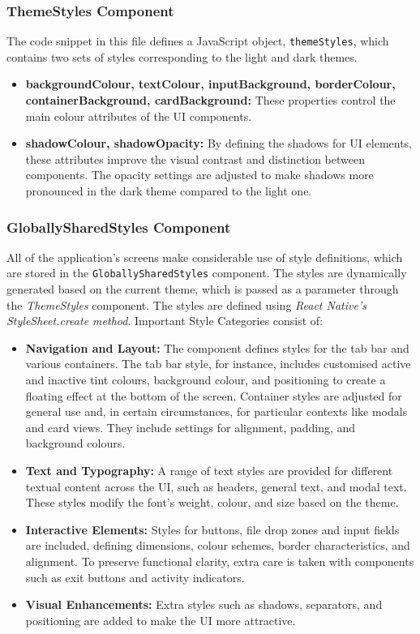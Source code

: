 \subsubsection{ThemeStyles Component}

The code snippet in this file defines a JavaScript object, \texttt{themeStyles}, which contains two sets of styles corresponding to the light and dark themes.

\begin{itemize}
    \item \textbf{backgroundColour, textColour, inputBackground, borderColour, containerBackground, cardBackground:} These properties control the main colour attributes of the UI components.
    \item \textbf{shadowColour, shadowOpacity:} By defining the shadows for UI elements, these attributes improve the visual contrast and distinction between components. The opacity settings are adjusted to make shadows more pronounced in the dark theme compared to the light one.
\end{itemize}

\subsubsection{GloballySharedStyles Component}

All of the application's screens make considerable use of style definitions, which are stored in the \texttt{GloballySharedStyles} component. The styles are dynamically generated based on the current theme, which is passed as a parameter through the \textit{ThemeStyles} component. The styles are defined using \textit{React Native's} \textit{StyleSheet.create method}. Important Style Categories consist of:

\begin{itemize}
    \item \textbf{Navigation and Layout:} The component defines styles for the tab bar and various containers. The tab bar style, for instance, includes customised active and inactive tint colours, background colour, and positioning to create a floating effect at the bottom of the screen. Container styles are adjusted for general use and, in certain circumstances, for particular contexts like modals and card views. They include settings for alignment, padding, and background colours.
    \item \textbf{Text and Typography:} A range of text styles are provided for different textual content across the UI, such as headers, general text, and modal text. These styles modify the font's weight, colour, and size based on the theme.
    \item \textbf{Interactive Elements:} Styles for buttons, file drop zones and input fields are included, defining dimensions, colour schemes, border characteristics, and alignment. To preserve functional clarity, extra care is taken with components such as exit buttons and activity indicators.
    \item \textbf{Visual Enhancements:} Extra styles such as shadows, separators, and positioning are added to make the UI more attractive.
\end{itemize}

